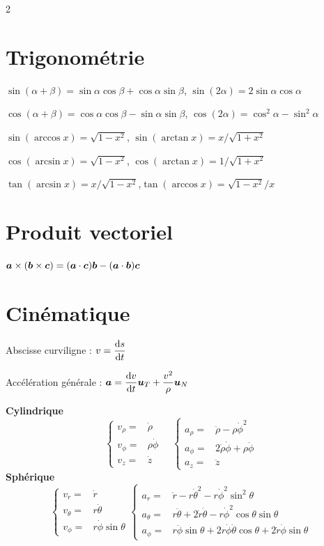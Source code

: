 \documentclass[10pt,a4paper,twoside]{article}
\begin{document}
\begin{multicols}{2}

\section*{Trigonométrie}
$\sin (\alpha + \beta) = \sin \alpha \cos \beta + \cos \alpha \sin \beta$, $\sin (2\alpha) = 2 \sin \alpha \cos \alpha$

$\cos (\alpha+\beta) = \cos \alpha \cos \beta - \sin \alpha \sin \beta$,  $\cos (2\alpha) = \cos ^2\alpha - \sin ^2\alpha$

$\sin(\arccos x) = \sqrt{1 - x^2}$, $\sin(\arctan x) = x / \sqrt{1 + x^2}$


$\cos(\arcsin x) = \sqrt{1 - x^2}$, 
$\cos(\arctan x) = 1 / \sqrt{1 + x^2}$


$\tan(\arcsin x) = x / \sqrt{1 - x^2}$,$\tan(\arccos x) = \sqrt{1 - x^2} / x$

\section*{Produit vectoriel}

$\bf{a} \times (\bf{b} \times  \bf{c}) = (\bf{a} \cdot  \bf{c}) \bf{b} - (\bf{a} \cdot \bf{b})\bf{c}$

\section*{Cinématique}
Abscisse curviligne : $v = \frac{\d s}{\d t} $

Accélération générale : $\bf{a} = \frac{\d v}{\d t} \bf{u}_{T} + \frac{v^2}{\rho} \bf{u}_{N}$

\textbf{Cylindrique}
\[
\left\{
    \begin{array}{ll}
		v_{\rho} =& \dot{\rho} \\
		v_{\phi} =&  \rho\dot{\phi}\\
		v_{z} =& \dot{z}
    \end{array}
\right.
 \quad 
\left\{
    \begin{array}{ll}
		a_{\rho} =& \ddot{\rho} - \rho \dot{\phi}^2 \\
		a_{\phi} =& 2 \dot{\rho}\dot{\phi} + \rho \ddot{\phi} \\
		a_{z} =& \ddot{z}
    \end{array}
\right.
\]
\textbf{Sphérique}
\[
\left\{ 
    \begin{array}{ll}
		v_{r} =& \dot{r}\\
		v_{\theta} =& r \dot{\theta} \\
		v_{\phi} =& r \dot{\phi} \sin \theta
    \end{array}
\right.
\left\{ 
    \begin{array}{ll}
		a_{r} =& \ddot{r} - r \dot{\theta}^2 - r \dot{\phi}^2 \sin ^2\theta\\
		a_{\theta} =& r \ddot{\theta} + 2 \dot{r}\dot{\theta} - r \dot{\phi}^2 \cos \theta \sin \theta\\
		a_{\phi} =& r \ddot{\phi} \sin  \theta + 2 r \dot{\phi} \dot{\theta} \cos \theta + 2 \dot{r}\dot{\phi} \sin \theta
    \end{array}
\right.
\] 


\end{multicols}
\end{document}
